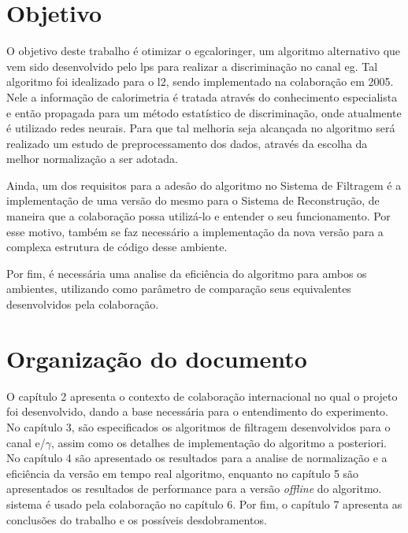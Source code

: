 \section{Objetivo} %

O objetivo deste trabalho é otimizar o \gls{egcaloringer},
um algoritmo alternativo que vem sido desenvolvido pelo \gls{lps}
para realizar a discriminação 
no canal \acrshort{eg}. Tal algoritmo foi idealizado para o \gls{l2}, 
sendo implementado na colaboração em 2005.
Nele a informação de calorimetria é tratada através do conhecimento especialista
e então propagada para um método estatístico 
de discriminação, onde atualmente é utilizado redes neurais. 
Para que tal melhoria seja alcançada no
algoritmo será realizado um estudo de preprocessamento dos dados,
através da escolha da melhor normalização a ser adotada.

Ainda, um dos requisitos para a adesão do algoritmo no Sistema de Filtragem é a
implementação de uma versão do mesmo para o Sistema de Reconstrução,
de maneira  que a colaboração possa utilizá-lo e entender o seu
funcionamento. Por esse motivo, também se faz necessário a implementação 
da nova versão para a complexa estrutura de código desse ambiente.

Por fim, é necessária uma analise da eficiência do algoritmo para ambos os
ambientes, utilizando como parâmetro de comparação seus equivalentes 
desenvolvidos pela colaboração.

\section{Organização do documento} %

O capítulo 2 apresenta o contexto de colaboração internacional no qual o projeto
foi desenvolvido, dando a base necessária para o entendimento do experimento. No
capítulo 3, são especificados os algoritmos de filtragem desenvolvidos para o
canal e/$\gamma$, assim como os detalhes de implementação do algoritmo
a posteriori. No capítulo 4 são apresentado os resultados para a analise de
normalização e a eficiência da versão em tempo real algoritmo, enquanto no
capítulo 5 são apresentados os resultados de performance para a versão {\it
offline} do algoritmo. 
sistema é usado pela colaboração no capítulo 6. Por fim, o capítulo 7 apresenta
as conclusões do trabalho e os possíveis desdobramentos.

